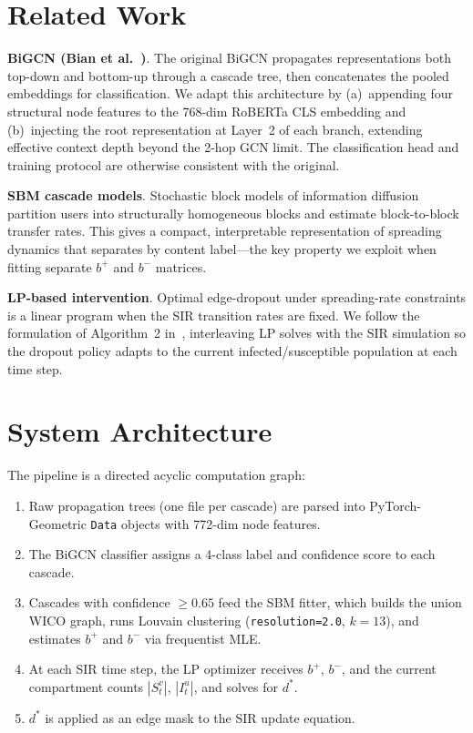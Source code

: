 \documentclass[conference]{IEEEtran}
\begin{document}
\section{Related Work}

\textbf{BiGCN (Bian et al.~\cite{bian2020rumor})}.
The original BiGCN propagates representations both top-down and bottom-up
through a cascade tree, then concatenates the pooled embeddings for
classification.
We adapt this architecture by (a)~appending four structural node features to
the 768-dim RoBERTa CLS embedding and (b)~injecting the root representation at
Layer~2 of each branch, extending effective context depth beyond the 2-hop GCN
limit.
The classification head and training protocol are otherwise consistent with
the original.

\textbf{SBM cascade models}.
Stochastic block models of information diffusion partition users into
structurally homogeneous blocks and estimate block-to-block transfer rates.
This gives a compact, interpretable representation of spreading dynamics that
separates by content label---the key property we exploit when fitting separate
\(b^+\) and \(b^-\) matrices.

\textbf{LP-based intervention}.
Optimal edge-dropout under spreading-rate constraints is a linear program when
the SIR transition rates are fixed.
We follow the formulation of Algorithm~2 in~\cite{infoshield_algo}, interleaving
LP solves with the SIR simulation so the dropout policy adapts to the current
infected/susceptible population at each time step.

\section{System Architecture}

The pipeline is a directed acyclic computation graph:

\begin{enumerate}
  \item Raw propagation trees (one file per cascade) are parsed into
    PyTorch-Geometric \texttt{Data} objects with 772-dim node features.
  \item The BiGCN classifier assigns a 4-class label and confidence score to
    each cascade.
  \item Cascades with confidence \(\geq 0.65\) feed the SBM fitter, which
    builds the union WICO graph, runs Louvain clustering (\texttt{resolution=2.0},
    \(k=13\)), and estimates \(b^+\) and \(b^-\) via frequentist MLE.
  \item At each SIR time step, the LP optimizer receives \(b^+\), \(b^-\), and
    the current compartment counts \(|S^v_t|\), \(|I^u_t|\), and solves for
    \(d^*\).
  \item \(d^*\) is applied as an edge mask to the SIR update equation.
\end{enumerate}
\end{document}
